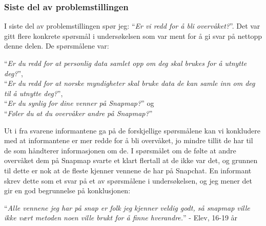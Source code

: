 \subsubsection{Siste del av problemstillingen}
I siste del av problemstillingen spør jeg: ``\textit{Er vi redd for å bli overvåket?}''. Det var gitt flere konkrete spørsmål i undersøkelsen som var ment for å gi svar på nettopp denne delen. De spørsmålene var:

``\textit{Er du redd for at personlig data samlet opp om deg skal brukes for å utnytte deg?}'',\\
``\textit{Er du redd for at norske myndigheter skal bruke data de kan samle inn om deg til å utnytte deg?}'',\\
``\textit{Er du synlig for dine venner på Snapmap?}'' og \\
``\textit{Føler du at du overvåker andre på Snapmap?}''
\newpage

Ut i fra svarene informantene ga på de forskjellige spørsmålene kan vi konkludere med at informantene er mer redde for å bli overvåket, jo mindre tillit de har til de som håndterer informasjonen om de. I spørsmålet om de følte at andre overvåket dem på Snapmap svarte et klart flertall at de ikke var det, og grunnen til dette er nok at de fleste kjenner vennene de har på Snapchat. En informant skrev dette som et svar på et av spørsmålene i undersøkelsen, og jeg mener det gir en god begrunnelse på konklusjonen: 

``\textit{Alle vennene jeg har på snap er folk jeg kjenner veldig godt, så snapmap ville ikke vært metoden noen ville brukt for å finne hverandre.}'' - Elev, 16-19 år



\newpage
